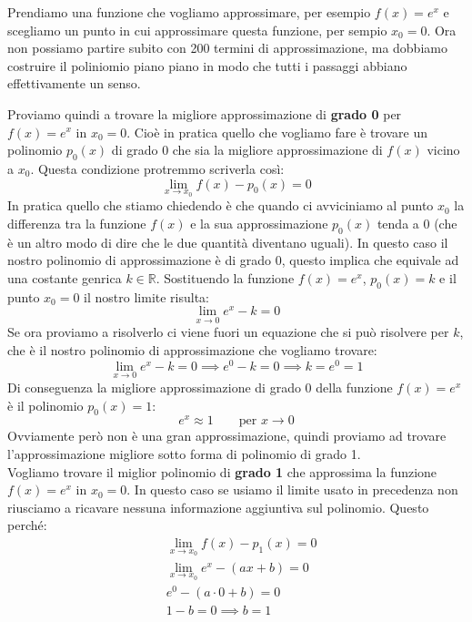 Prendiamo una funzione che vogliamo approssimare, per esempio $f(x) = e^x$ e scegliamo un punto in cui approssimare questa funzione, per sempio $x_0 = 0$. Ora non possiamo partire subito con 200 termini di approssimazione, ma dobbiamo costruire il poliniomio piano piano in modo che tutti i passaggi abbiano effettivamente un senso. 

Proviamo quindi a trovare la migliore approssimazione di \textbf{grado 0} per $f(x) = e^x$ in $x_0 = 0$. Cioè in pratica quello che vogliamo fare è trovare un polinomio $p_0(x)$ di grado $0$ che sia la migliore approssimazione di $f(x)$ vicino a $x_0$. Questa condizione protremmo scriverla così:
\begin{equation*}
	\lim_{x \to x_0} f(x) - p_0(x) = 0
\end{equation*}
In pratica quello che stiamo chiedendo è che quando ci avviciniamo al punto $x_0$ la differenza tra la funzione $f(x)$ e la sua approssimazione $p_0(x)$ tenda a 0 (che è un altro modo di dire che le due quantità diventano uguali). In questo caso il nostro polinomio di approssimazione è di grado 0, questo implica che equivale ad una costante genrica $k \in \mathbb{R}$. Sostituendo la funzione $f(x) = e^x$, $p_0(x) = k$ e il punto $x_0 = 0$ il nostro limite risulta:
\begin{equation*}
	\lim_{x \to 0} e^x - k  = 0
\end{equation*}
Se ora proviamo a risolverlo ci viene fuori un equazione che si può risolvere per $k$, che è il nostro polinomio di approssimazione che vogliamo trovare:
\begin{equation*}
	\lim_{x \to 0} e^x - k  = 0 \implies e^0 - k  = 0 \implies k = e^0 = 1
\end{equation*}
Di conseguenza la migliore approssimazione di grado 0 della funzione $f(x) = e^x$ è il polinomio $p_0(x) = 1$:
\begin{equation*}
	e^x \approx 1 \qquad \text{per } x \to 0
\end{equation*}
Ovviamente però non è una gran approssimazione, quindi proviamo ad trovare l'approssimazione migliore sotto forma di polinomio di grado 1.\\

Vogliamo trovare il miglior polinomio di \textbf{grado 1} che approssima la funzione $f(x) = e^x$ in $x_0 = 0$. In questo caso se usiamo il limite usato in precedenza non riusciamo a ricavare nessuna informazione aggiuntiva sul polinomio. Questo perché:
\begin{align*}
	&\lim_{x \to x_0} f(x) - p_1(x) = 0\\
	&\lim_{x \to x_0} e^x - (ax + b) = 0\\
	&e^0 - (a \cdot 0 + b) = 0\\
	&1 - b = 0 \implies b = 1
\end{align*}

